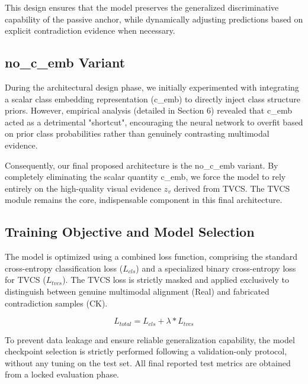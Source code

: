 This design ensures that the model preserves the generalized discriminative capability of the passive anchor, while dynamically adjusting predictions based on explicit contradiction evidence when necessary.

\subsection{no\_c\_emb Variant}
During the architectural design phase, we initially experimented with integrating a scalar class embedding representation (c\_emb) to directly inject class structure priors. However, empirical analysis (detailed in Section 6) revealed that c\_emb acted as a detrimental "shortcut", encouraging the neural network to overfit based on prior class probabilities rather than genuinely contrasting multimodal evidence.

Consequently, our final proposed architecture is the no\_c\_emb variant. By completely eliminating the scalar quantity c\_emb, we force the model to rely entirely on the high-quality visual evidence $z_v$ derived from TVCS. The TVCS module remains the core, indispensable component in this final architecture.

\subsection{Training Objective and Model Selection}
The model is optimized using a combined loss function, comprising the standard cross-entropy classification loss ($L_{cls}$) and a specialized binary cross-entropy loss for TVCS ($L_{tvcs}$). The TVCS loss is strictly masked and applied exclusively to distinguish between genuine multimodal alignment (Real) and fabricated contradiction samples (CK).

\begin{equation}
L_{total} = L_{cls} + \lambda * L_{tvcs}
\end{equation}

To prevent data leakage and ensure reliable generalization capability, the model checkpoint selection is strictly performed following a validation-only protocol, without any tuning on the test set. All final reported test metrics are obtained from a locked evaluation phase.

